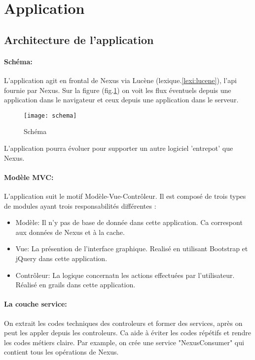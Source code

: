 \section{Application}

\subsection{Architecture de l'application}

\paragraph{Schéma:}
L'application agit en frontal de Nexus via Lucène (lexique.\ref{lexi:lucene}), l'api fournie par Nexus.
Sur la figure (fig.\ref{fig:schema}) on voit les flux éventuels depuis une application dans le navigateur et ceux depuis une application dans le serveur.

\begin{figure}[ht]
 \centering
 \texttt{[image: schema]}
 \caption{Schéma}
 \label{fig:schema}
\end{figure}

L'application pourra évoluer pour supporter un autre logiciel 'entrepot' que Nexus.

\paragraph{Modèle MVC:}
L'application suit le motif Modèle-Vue-Contrôleur.
Il est composé de  trois types de modules ayant trois responsabilités différentes :
\begin{itemize}
 \item Modèle: Il n'y pas de base de donnée dans cette application. Ca correspont aux données de Nexus et à la cache.
 \item Vue: La présention de l'interface graphique. Realisé en utilisant Bootstrap et jQuery dans cette application.
 \item Contrôleur: La logique concernatn les actions effectuées par l'utilisateur. Réalisé en grails dans cette application.
\end{itemize}

\paragraph{La couche service:}
On extrait les codes techniques des controleurs et former des services, après on peut les appler depuis les controleurs.
Ca aide à éviter les codes répétifs et rendre les codes métiers claire.
Par example, on crée une service "NexusConsumer" qui contient tous les opérations de Nexus.

